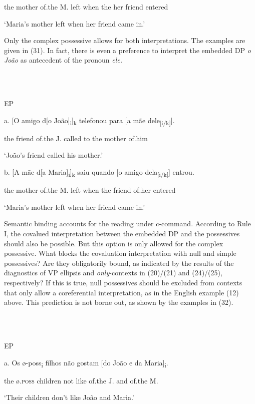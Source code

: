 \documentclass[output=paper]{langsci/langscibook}
\begin{document}
the mother of.the M. left when the her friend entered

‘Maria’s mother left when her friend came in.’

Only the complex possessive allows for both interpretations. The examples are given in (31). In fact, there is even a preference to interpret the embedded DP \textit{o João} as antecedent of the pronoun \textit{ele.}

\ea%
    \label{ex:key:31}
    \gll\\
        \\
    \glt
    \z

          EP

  a.  [O amigo d[o João]\textsubscript{i}]\textsubscript{k} telefonou para [a mãe dele\textsubscript{[i/k]}].

the friend of.the J. called to the mother of.him

‘João’s friend called his mother.’

  b.  [A mãe d[a Maria]\textsubscript{i}]\textsubscript{k} saiu quando [o amigo dela\textsubscript{[i/k]}] entrou.

the mother of.the M. left when the friend of.her entered

‘Maria’s mother left when her friend came in.’

Semantic binding accounts for the reading under c-command. According to Rule I, the covalued interpretation between the embedded DP and the possessives should also be possible. But this option is only allowed for the complex possessive. What blocks the covaluation interpretation with null and simple possessives? Are they obligatorily bound, as indicated by the results of the diagnostics of VP ellipsis and \textit{only}{}-contexts in (20)/(21) and (24)/(25), respectively? If this is true, null possessives should be excluded from contexts that only allow a coreferential interpretation, as in the English example (12) above. This prediction is not borne out, as shown by the examples in (32).

\ea%
    \label{ex:key:32}
    \gll\\
        \\
    \glt
    \z

          EP

  a.  Os ø-poss\textsubscript{i} filhos não gostam [do João e da Maria]\textsubscript{i}.

the ø\textsc{.poss} children not like of.the J. and of.the M.

‘Their children don’t like João and Maria.’
\end{document}

